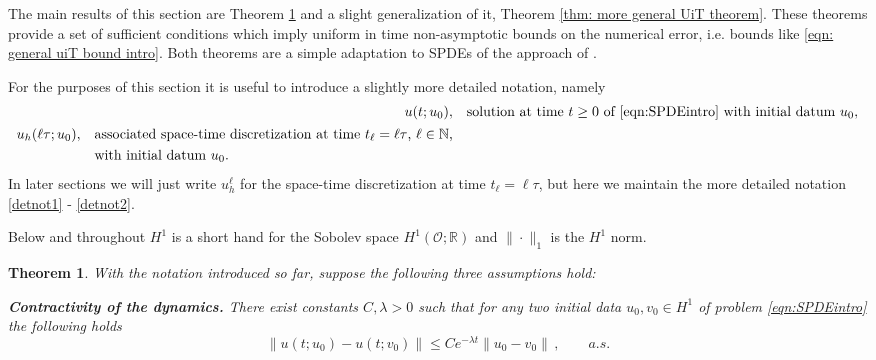 \documentclass[reqno, 11pt]{amsart}
\theoremstyle{plain}
\newtheorem{theorem}{Theorem}[section]
\theoremstyle{definition}
\theoremstyle{remark}
\numberwithin{equation}{section}
\numberwithin{theorem}{section}
\newcommand{\R}{\mathbb{R}}
\newcommand{\N}{\mathbb{N}}
\begin{document}
{The main results of this section are Theorem \ref{thm: UiT theorem in our case} and a slight generalization of it, Theorem \ref{thm: more general UiT theorem}. These theorems  provide a set of sufficient conditions  which imply  uniform in time non-asymptotic bounds on the numerical error, i.e. bounds like \eqref{eqn: general uiT bound intro}.  Both  theorems are a simple adaptation to SPDEs of the approach of \cite{schuh2024conditions}. 

For the purposes of this section it is useful to introduce a slightly more detailed notation, namely
\begin{subequations}
\begin{align}
    u(t;u_0), & \quad \text{solution at time $t\geq 0$ of \eqref{eqn:SPDEintro} with initial datum $u_0$}, \label{detnot1}\\
    \begin{split}
    u_h(\ell \tau;u_0), &\quad \text{associated space-time discretization at time $t_{\ell}= \ell \tau$, $\ell \in \N$,}\\
    & \quad \text{with initial datum $u_0$}. \label{detnot2}
    \end{split}
\end{align}
\end{subequations}
In later sections we will just write $u_h^{\ell}$ for the space-time discretization at time $t_{\ell}=\ell \tau$, but here we maintain the more detailed notation \eqref{detnot1} - \eqref{detnot2}. 





Below and throughout $H^1$ is a short hand for the Sobolev space $H^1(\mathcal O;\R)$ and $\|\cdot\|_1$ is the $H^1$ norm. 

\begin{theorem}\label{thm: UiT theorem in our case}
    With  the notation introduced so far, suppose the following three assumptions hold:
    \begin{enumerate}[label=\textnormal{[H\arabic*]},ref={[H\arabic*]}]
\item\label{Contractivity of SPDE}{\bf Contractivity of the dynamics.} There exist constants  $C, \lambda>0$ such that for any two initial data $u_0, v_0 \in H^1$ of  problem \eqref{eqn:SPDEintro} the following holds
\begin{equation}
    \|u(t;u_0) - u(t;v_0)\| \leq C e^{-\lambda t} \|u_0 - v_0 \| \,,\qquad  a.s. 
\end{equation}



\end{enumerate}
\end{theorem}}
\end{document}

